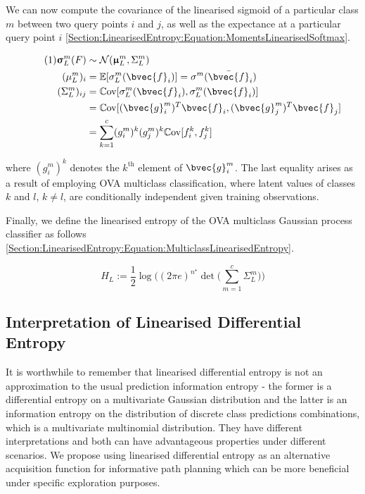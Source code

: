 \documentclass{article}
\renewcommand{\vec}[1]{\boldsymbol{#1}}
\newcommand\numberthis{\addtocounter{equation}{1}\tag{\theequation}}
\begin{document}
			We can now compute the covariance of the linearised sigmoid of a particular class $m$ between two query points $i$ and $j$, as well as the expectance at a particular query point $i$ \eqref{Section:LinearisedEntropy:Equation:MomentsLinearisedSoftmax}.
			
			\begin{align*}
			\numberthis \label{Section:LinearisedEntropy:Equation:MomentsLinearisedSoftmax}
					\vec{\upsigma}^{m}_{L}(F) & \sim \mathcal{N}(\vec{\upmu}^{m}_{L}, \Sigma^{m}_{L}) \\
					(\mu^{m}_{L})_{i} & = \mathbb{E}[\sigma^{m}_{L}(\bvec{f}_{i})] =  \sigma^{m}(\bar{\bvec{f}}_{i}) \\
					(\Sigma^{m}_{L})_{ij} & = \mathbb{C}\mathrm{ov}[\sigma^{m}_{L}(\bvec{f}_{i}), \sigma^{m}_{L}(\bvec{f}_{i})] \\
					& = \mathbb{C}\mathrm{ov}[(\bvec{g}^{m}_{i})^{T} \bvec{f}_{i}, (\bvec{g}^{m}_{j})^{T} \bvec{f}_{j}] \\
					& = \sum_{k = 1}^{c} (g^{m}_{i})^{k} (g^{m}_{j})^{k} \mathbb{C}\mathrm{ov}[f^{k}_{i}, f^{k}_{j}]
			\end{align*}
						
			where $(g^{m}_{i})^{k}$ denotes the $k^{\text{th}}$ element of $\bvec{g}^{m}_{i}$. The last equality arises as a result of employing OVA multiclass classification, where latent values of classes $k$ and $l$, $k \neq l$, are conditionally independent given training observations.
			
			Finally, we define the linearised entropy of the OVA multiclass Gaussian process classifier as follows \eqref{Section:LinearisedEntropy:Equation:MulticlassLinearisedEntropy}.
			
			\begin{equation}
				H_{L} := \frac{1}{2} \log\Bigg((2 \pi e)^{n^{\star}} \det\bigg(\sum_{m = 1}^{c} \Sigma^{m}_{L}\bigg)\Bigg)
			\label{Section:LinearisedEntropy:Equation:MulticlassLinearisedEntropy}
			\end{equation}			
	
	\subsection{Interpretation of Linearised Differential Entropy}
	
		It is worthwhile to remember that linearised differential entropy is not an approximation to the usual prediction information entropy - the former is a differential entropy on a multivariate Gaussian distribution and the latter is an information entropy on the distribution of discrete class predictions combinations, which is a multivariate multinomial distribution. They have different interpretations and both can have advantageous properties under different scenarios. We propose using linearised differential entropy as an alternative acquisition function for informative path planning which can be more beneficial under specific exploration purposes.
		
\end{document}
